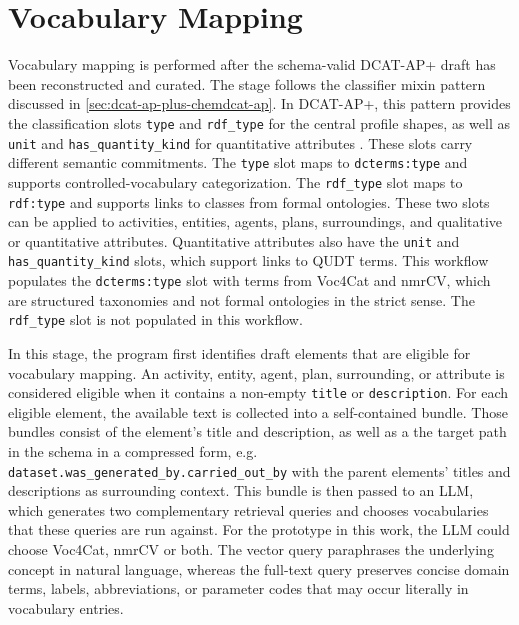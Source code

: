 \section{Vocabulary Mapping}
\label{sec:vocabulary_mapping}

Vocabulary mapping is performed after the schema-valid \ac{DCAT-AP+} draft has been reconstructed and curated.
The stage follows the classifier mixin pattern discussed in \cref{sec:dcat-ap-plus-chemdcat-ap}.
In \ac{DCAT-AP+}, this pattern provides the classification slots \texttt{type} and \texttt{rdf\_\allowbreak{}type} for the central profile shapes, as well as \texttt{unit} and \texttt{has\_\allowbreak{}quantity\_\allowbreak{}kind} for quantitative attributes \cite{dcatapplusDocumentation}.
These slots carry different semantic commitments.
The \texttt{type} slot maps to \texttt{dcterms:type} and supports controlled-vocabulary categorization.
The \texttt{rdf\_\allowbreak{}type} slot maps to \texttt{rdf:type} and supports links to classes from formal ontologies.
These two slots can be applied to activities, entities, agents, plans, surroundings, and qualitative or quantitative attributes.
Quantitative attributes also have the \texttt{unit} and \texttt{has\_\allowbreak{}quantity\_\allowbreak{}kind} slots, which support links to \ac{QUDT} terms.
This workflow populates the \texttt{dcterms:type} slot with terms from \ac{Voc4Cat} and \ac{nmrCV}, which are structured taxonomies and not formal ontologies in the strict sense.
The \texttt{rdf\_\allowbreak{}type} slot is not populated in this workflow.

In this stage, the program first identifies draft elements that are eligible for vocabulary mapping.
An activity, entity, agent, plan, surrounding, or attribute is considered eligible when it contains a non-empty \texttt{title} or \texttt{description}.
For each eligible element, the available text is collected into a self-contained bundle.
Those bundles consist of the element's title and description, as well as a the target path in the schema in a compressed form, e.g. \texttt{dataset.was\_generated\_by.carried\_out\_by} with the parent elements' titles and descriptions as surrounding context.
This bundle is then passed to an \ac{LLM}, which generates two complementary retrieval queries and chooses vocabularies that these queries are run against.
For the prototype in this work, the \ac{LLM} could choose \ac{Voc4Cat}, \ac{nmrCV} or both.
The vector query paraphrases the underlying concept in natural language, whereas the full-text query preserves concise domain terms, labels, abbreviations, or parameter codes that may occur literally in vocabulary entries.


